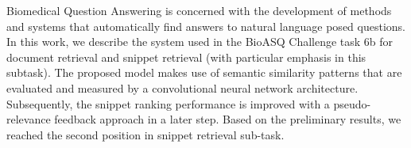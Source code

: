 Biomedical Question Answering is concerned with the development of methods and systems that automatically find answers to natural language posed questions.  In this work, we describe the system used in the BioASQ Challenge task 6b for document retrieval and snippet retrieval (with particular emphasis in this subtask). The proposed model makes use of semantic similarity patterns that are evaluated and measured by a convolutional neural network architecture. Subsequently, the snippet ranking performance is improved with a pseudo-relevance feedback approach in a later step.  Based on the preliminary results, we reached the second position in snippet retrieval sub-task.
